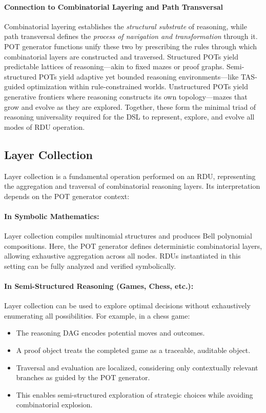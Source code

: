 \documentclass[11pt]{article}
\begin{document}
\paragraph{Connection to Combinatorial Layering and Path Transversal}
Combinatorial layering establishes the \textit{structural substrate} of reasoning, while path transversal defines the \textit{process of navigation and transformation} through it. POT generator functions unify these two by prescribing the rules through which combinatorial layers are constructed and traversed.  
Structured POTs yield predictable lattices of reasoning—akin to fixed mazes or proof graphs.  
Semi-structured POTs yield adaptive yet bounded reasoning environments—like TAS-guided optimization within rule-constrained worlds.  
Unstructured POTs yield generative frontiers where reasoning constructs its own topology—mazes that grow and evolve as they are explored.  
Together, these form the minimal triad of reasoning universality required for the DSL to represent, explore, and evolve all modes of RDU operation.


\subsection{Layer Collection}
Layer collection is a fundamental operation performed on an RDU, representing the aggregation and traversal of combinatorial reasoning layers. Its interpretation depends on the POT generator context:

\paragraph{In Symbolic Mathematics:}  
Layer collection compiles multinomial structures and produces Bell polynomial compositions. Here, the POT generator defines deterministic combinatorial layers, allowing exhaustive aggregation across all nodes. RDUs instantiated in this setting can be fully analyzed and verified symbolically.

\paragraph{In Semi-Structured Reasoning (Games, Chess, etc.):}  
Layer collection can be used to explore optimal decisions without exhaustively enumerating all possibilities. For example, in a chess game:
\begin{itemize}
    \item The reasoning DAG encodes potential moves and outcomes.
    \item A proof object treats the completed game as a traceable, auditable object.
    \item Traversal and evaluation are localized, considering only contextually relevant branches as guided by the POT generator.
    \item This enables semi-structured exploration of strategic choices while avoiding combinatorial explosion.
\end{itemize}
\end{document}
